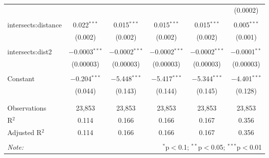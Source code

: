 \begin{table}[!htbp]
\begin{tabular}{@{\extracolsep{-5pt}}lccccc}
  &  &  &  &  & (0.0002) \\ 
  & & & & & \\ 
 intersects:distance & 0.022$^{***}$ & 0.015$^{***}$ & 0.015$^{***}$ & 0.015$^{***}$ & 0.005$^{***}$ \\ 
  & (0.002) & (0.002) & (0.002) & (0.002) & (0.001) \\ 
  & & & & & \\ 
 intersects:dist2 & $-$0.0003$^{***}$ & $-$0.0002$^{***}$ & $-$0.0002$^{***}$ & $-$0.0002$^{***}$ & $-$0.0001$^{**}$ \\ 
  & (0.00003) & (0.00003) & (0.00003) & (0.00003) & (0.00003) \\ 
  & & & & & \\ 
 Constant & $-$0.204$^{***}$ & $-$5.448$^{***}$ & $-$5.417$^{***}$ & $-$5.344$^{***}$ & $-$4.401$^{***}$ \\ 
  & (0.044) & (0.143) & (0.144) & (0.145) & (0.128) \\ 
  & & & & & \\ 
\hline \\[-1.8ex] 
Observations & 23,853 & 23,853 & 23,853 & 23,853 & 23,853 \\ 
R$^{2}$ & 0.114 & 0.166 & 0.166 & 0.167 & 0.356 \\ 
Adjusted R$^{2}$ & 0.114 & 0.166 & 0.166 & 0.167 & 0.356 \\ 
\hline 
\hline \\[-1.8ex] 
\textit{Note:}  & \multicolumn{5}{r}{$^{*}$p$<$0.1; $^{**}$p$<$0.05; $^{***}$p$<$0.01} \\ 
\end{tabular} 
\end{table} 
